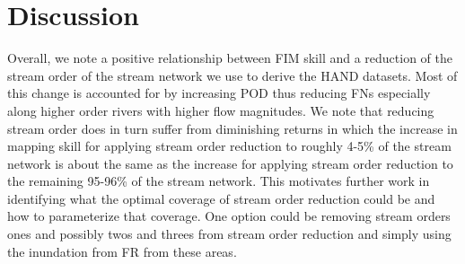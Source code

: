 \section{Discussion}
\label{sec:discussion}
%
Overall, we note a positive relationship between FIM skill and a reduction of the stream order of the stream network we use to derive the HAND datasets.
Most of this change is accounted for by increasing POD thus reducing FNs especially along higher order rivers with higher flow magnitudes.
We note that reducing stream order does in turn suffer from diminishing returns in which the increase in mapping skill for applying stream order reduction to roughly 4-5\% of the stream network is about the same as the increase for applying stream order reduction to the remaining 95-96\% of the stream network.
This motivates further work in identifying what the optimal coverage of stream order reduction could be and how to parameterize that coverage. 
One option could be removing stream orders ones and possibly twos and threes from stream order reduction and simply using the inundation from FR from these areas.

